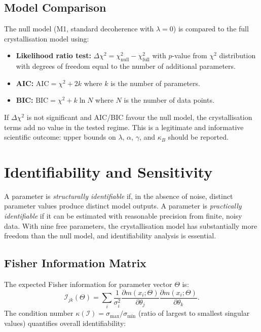 \documentclass[12pt]{article}
\begin{document}
\subsection{Model Comparison}

The null model (M1, standard decoherence with $\lambda = 0$) is compared to the full crystallisation model using:
\begin{itemize}
    \item \textbf{Likelihood ratio test:} $\Delta\chi^2 = \chi^2_{\mathrm{null}} - \chi^2_{\mathrm{full}}$ with $p$-value from $\chi^2$ distribution with degrees of freedom equal to the number of additional parameters.
    \item \textbf{AIC:} $\mathrm{AIC} = \chi^2 + 2k$ where $k$ is the number of parameters.
    \item \textbf{BIC:} $\mathrm{BIC} = \chi^2 + k \ln N$ where $N$ is the number of data points.
\end{itemize}
If $\Delta\chi^2$ is not significant and AIC/BIC favour the null model, the crystallisation terms add no value in the tested regime. This is a legitimate and informative scientific outcome: upper bounds on $\lambda$, $\alpha$, $\gamma$, and $\kappa_B$ should be reported.

\section{Identifiability and Sensitivity}
\label{sec:identifiability}

A parameter is \emph{structurally identifiable} if, in the absence of noise, distinct parameter values produce distinct model outputs. A parameter is \emph{practically identifiable} if it can be estimated with reasonable precision from finite, noisy data. With nine free parameters, the crystallisation model has substantially more freedom than the null model, and identifiability analysis is essential.

\subsection{Fisher Information Matrix}

The expected Fisher information for parameter vector $\Theta$ is:
\begin{equation}
\mathcal{I}_{jk}(\Theta) = \sum_i \frac{1}{\sigma_i^2} \frac{\partial m(x_i; \Theta)}{\partial \theta_j} \frac{\partial m(x_i; \Theta)}{\partial \theta_k}.
\end{equation}
The condition number $\kappa(\mathcal{I}) = \sigma_{\max} / \sigma_{\min}$ (ratio of largest to smallest singular values) quantifies overall identifiability:
\end{document}
